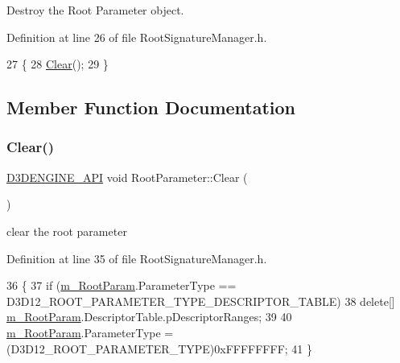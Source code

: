 Destroy the Root Parameter object. 



Definition at line 26 of file Root\+Signature\+Manager.\+h.


\begin{DoxyCode}
27     \{
28         \mbox{\hyperlink{class_root_parameter_af34b58a76d42011f188669331756d348}{Clear}}();
29     \}
\end{DoxyCode}


\subsection{Member Function Documentation}
\mbox{\label{class_root_parameter_af34b58a76d42011f188669331756d348}} 
\subsubsection{\texorpdfstring{Clear()}{Clear()}}
{\footnotesize\ttfamily \mbox{\hyperlink{stdafx_8h_a8ee2d990c5dfba7794dd2b60741d7722}{D3\+D\+E\+N\+G\+I\+N\+E\+\_\+\+A\+PI}} void Root\+Parameter\+::\+Clear (\begin{DoxyParamCaption}{ }\end{DoxyParamCaption})\hspace{0.3cm}{\ttfamily [inline]}}



clear the root parameter 



Definition at line 35 of file Root\+Signature\+Manager.\+h.


\begin{DoxyCode}
36     \{
37         \textcolor{keywordflow}{if} (\mbox{\hyperlink{class_root_parameter_a66f26d4bb3cd092c625bc083c508fe40}{m\_RootParam}}.ParameterType == D3D12\_ROOT\_PARAMETER\_TYPE\_DESCRIPTOR\_TABLE)
38             \textcolor{keyword}{delete}[] \mbox{\hyperlink{class_root_parameter_a66f26d4bb3cd092c625bc083c508fe40}{m\_RootParam}}.DescriptorTable.pDescriptorRanges;
39 
40         \mbox{\hyperlink{class_root_parameter_a66f26d4bb3cd092c625bc083c508fe40}{m\_RootParam}}.ParameterType = (D3D12\_ROOT\_PARAMETER\_TYPE)0xFFFFFFFF;
41     \}
\end{DoxyCode}
\mbox{\label{class_root_parameter_a098b00557380ae92da883d5cc8d90385}} 
